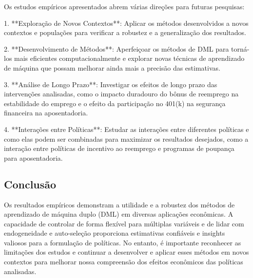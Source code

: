 \documentclass[a4paper,12pt]{article}[abntex2]
\begin{document}
Os estudos empíricos apresentados abrem várias direções para futuras pesquisas:

1. **Exploração de Novos Contextos**: Aplicar os métodos desenvolvidos a novos contextos e populações para verificar a robustez e a generalização dos resultados.

2. **Desenvolvimento de Métodos**: Aperfeiçoar os métodos de DML para torná-los mais eficientes computacionalmente e explorar novas técnicas de aprendizado de máquina que possam melhorar ainda mais a precisão das estimativas.

3. **Análise de Longo Prazo**: Investigar os efeitos de longo prazo das intervenções analisadas, como o impacto duradouro do bônus de reemprego na estabilidade do emprego e o efeito da participação no 401(k) na segurança financeira na aposentadoria.

4. **Interações entre Políticas**: Estudar as interações entre diferentes políticas e como elas podem ser combinadas para maximizar os resultados desejados, como a interação entre políticas de incentivo ao reemprego e programas de poupança para aposentadoria.

\subsection*{Conclusão}

Os resultados empíricos demonstram a utilidade e a robustez dos métodos de aprendizado de máquina duplo (DML) em diversas aplicações econômicas. A capacidade de controlar de forma flexível para múltiplas variáveis e de lidar com endogeneidade e auto-seleção proporciona estimativas confiáveis e insights valiosos para a formulação de políticas. No entanto, é importante reconhecer as limitações dos estudos e continuar a desenvolver e aplicar esses métodos em novos contextos para melhorar nossa compreensão dos efeitos econômicos das políticas analisadas.
\end{document}
